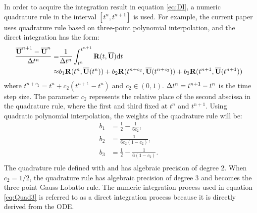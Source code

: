 In order to acquire the integration result in equation
\eqref{eq:DI}, a numeric quadrature rule in the interval
$[t^n, t^{n+1}]$ is used. For example, the current paper
uses quadrature rule based on three-point polynomial
interpolation, and the direct integration has
the form:
\begin{equation}
    \label{eq:Quad3}
    \begin{aligned}
        \frac{\overline{\mathbf{U}}^{n+1} - \overline{\mathbf{U}}^{n}}{{\Delta} t^n} = & \frac{1}{{\Delta} t^n}
        \int_{t^n}^{t^{n+1}}{
        \mathbf{R}(t, \overline{\mathbf{U}}) \dd t
        }                                                           \\ \approx &
        b_1\mathbf{R}(t^n, \overline{\mathbf{U}}(t^n))
        +
        b_2\mathbf{R}(t^{n+c_2}, \overline{\mathbf{U}}(t^{n+c_2}))
        +
        b_3\mathbf{R}(t^{n+1}, \overline{\mathbf{U}}(t^{n+1}))
    \end{aligned}
\end{equation}
where $t^{n+c_2} = t^{n} + c_2 (t^{n+1} - t^n)$ and $c_2\in(0,1)$.
${\Delta} t^n=t^{n+1} - t^n$ is
the time step size.
The parameter $c_2$ represents the relative place of the second abscissa
in the quadrature rule, where the first and third fixed at $t^{n}$ and $t^{n + 1}$.
Using quadratic polynomial interpolation,
the weights of the quadrature rule will be:
\begin{equation}
    \begin{aligned}
        b_1 & = \frac{1}{2} - \frac{1}{6{c_2}},     \\
        b_2 & = \frac{1}{6{c_2}(1-{c_2})},          \\
        b_3 & = \frac{1}{2} - \frac{1}{6(1-{c_2})}. \\
    \end{aligned}
    \label{eq:integ0}
\end{equation}
The quadrature rule defined with
 and  has algebraic precision
of degree 2. When $c_2=1/2$, the quadrature rule has algebraic precision of
degree 3 and becomes the three point Gauss-Lobatto rule.
The numeric integration process used in equation \eqref{eq:Quad3}
is referred to as a direct integration process because it is
directly derived from the ODE.



